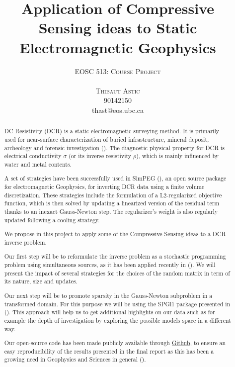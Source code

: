 \documentclass[twoside]{article}
\title{\vspace{-15mm}\fontsize{20pt}{10pt}\selectfont\textbf{Application of Compressive Sensing ideas to Static Electromagnetic Geophysics}} %
\author{
\Large
\textsc{EOSC 513: Course Project}
\\\\
\large
\textsc{Thibaut Astic}\\%
\textsc{90142150} \\ %
\normalsize thast@eos.ubc.ca
\vspace{-5mm}
}
\date{}
\begin{document}
\newcommand*{\vertbar}{\rule[-1ex]{0.5pt}{2.5ex}}
\newcommand*{\horzbar}{\rule[.5ex]{2.5ex}{0.5pt}}

\maketitle %



\begin{abstract}

DC Resistivity (DCR) is a static electromagnetic surveying method. It is primarily used for near-surface characterization of buried infrastructure, mineral deposit, archeology and forensic investigation (\cite{YO:1996}). The diagnostic physical property for DCR is electrical conductivity $\sigma$ (or its inverse resistivity $\rho$), which is mainly influenced by water and metal contents.

A set of strategies have been successfully used in SimPEG (\cite{CKH+:2015}), an open source package for electromagnetic Geophysics, for inverting DCR data using a finite volume discretization. These strategies include the formulation of a L2-regularized objective function, which is then solved by updating a linearized version of the residual term thanks to an inexact Gauss-Newton step. The regularizer's weight is also regularly updated following a cooling strategy.

We propose in this project to apply some of the Compressive Sensing ideas to a DCR inverse problem. 

Our first step will be to reformulate the inverse problem as a stochastic programming problem using simultaneous sources, as it has been applied recently in (\cite{HCH:2012}). We will present the impact of several strategies for the choices of the random matrix in term of its nature, size and updates. 

Our next step will be to promote sparsity in the Gauss-Newton subproblem in a transformed domain. For this purpose we will be using the SPGl1 package presented in (\cite{BF:2008}). This approach will help us to get additional highlights on our data such as for example the depth of investigation by exploring the possible models space in a different way.

Our open-source code has been made publicly available through \href{https://github.com/thast/EOSC513}{Github},  to ensure an easy reproducibility of the results presented in the final report as this has been a growing need in Geophysics and Sciences in general (\cite{SEG:2016}).


\end{abstract}
\end{document}
